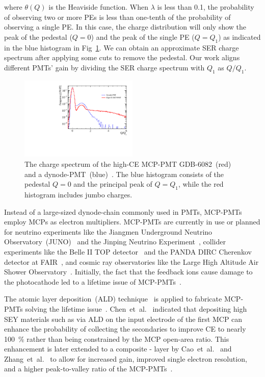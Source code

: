 where $\theta(Q)$ is the Heaviside function.
When $\lambda$ is less than 0.1,
the probability of observing two or more PEs is less than one-tenth of the probability of observing a single PE.
In this case, the charge distribution will only show the peak of the pedestal ($Q=0$) and the peak of the single PE ($Q=Q_1$) as indicated in the blue histogram in Fig~\ref{fig:spe_sreal}.
We can obtain an approximate SER charge spectrum after applying some cuts to remove the pedestal.
Our work aligns different PMTs' gain by dividing the SER charge spectrum with $Q_1$ as $Q/Q_1$.
\begin{figure}[!htbp]
	\centering
	\includegraphics[width=0.5\textwidth]{PMTRelated/GTmodel/spe.pdf}
	\caption{The charge spectrum of the high-CE MCP-PMT GDB-6082~(red) and a dynode-PMT~(blue)~\cite{Zhang:2023ued}.
		The blue histogram consists of the pedestal $Q=0$ and the principal peak of $Q=Q_1$, while the red histogram includes jumbo charges.}
	\label{fig:spe_sreal}
\end{figure}
Instead of a large-sized dynode-chain commonly used in PMTs,
MCP-PMTs employ MCPs as electron multipliers.
MCP-PMTs are currently in use or planned for neutrino experiments
like the Jiangmen Underground Neutrino Observatory~(JUNO)~\cite{ZHU2020162002} and the Jinping Neutrino Experiment~\cite{Zhang:2023ued},
collider experiments like the Belle II TOP detector~\cite{MATSUOKA2014148} and the PANDA DIRC Cherenkov detector at FAIR~\cite{KRAUSS2023168659},
and cosmic ray observatories like the Large High Altitude Air Shower Observatory~\cite{Cao2019UpgradingPT}.
Initially, the fact that the feedback ions cause damage to the photocathode
led to a lifetime issue of MCP-PMTs~\cite{N2006Lifetime}.

The atomic layer deposition~(ALD) technique~\cite{2012An}
is applied to fabricate MCP-PMTs solving the lifetime issue~\cite{Lehmann:2022ret}.
Chen~et~al.~\cite{2016Optimization} indicated that depositing high SEY materials
such as  via ALD on the input electrode of the first MCP
can enhance the probability of collecting the secondaries to improve CE
to nearly \SI{100}{\%} rather than being constrained by the MCP open-area ratio.
This enhancement is later extended to a composite - layer
by Cao~et~al.~\cite{cao_secondary_2021} and Zhang~et~al.~\cite{zzj2021Al}
to allow for increased gain, improved single electron resolution,
and a higher peak-to-valley ratio of the MCP-PMTs~\cite{2021Effects}.

